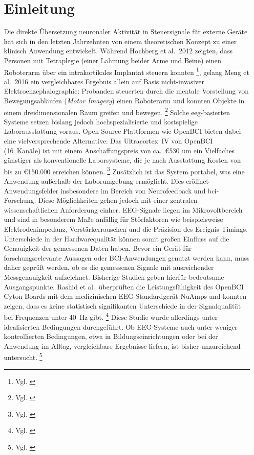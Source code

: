 \chapter{Einleitung} 
Die direkte Übersetzung neuronaler Aktivität in Steuersignale für externe Geräte hat sich in den letzten Jahrzehnten von einem theoretischen Konzept zu einer klinisch Anwendung entwickelt. Während Hochberg et al.\ 2012 zeigten, dass Personen mit Tetraplegie (einer Lähmung beider Arme und Beine) einen Roboterarm über ein intrakortikales Implantat steuern konnten \footnote{Vgl. \cite{hochberg2012_roboticarm}}, gelang Meng et al.\ 2016 ein vergleichbares Ergebnis allein auf Basis nicht-invasiver Elektroenzephalographie: Probanden steuerten durch die mentale Vorstellung von Bewegungsabläufen (\textit{Motor Imagery}) einen Roboterarm und konnten Objekte in einem dreidimensionalen Raum greifen und bewegen. \footnote{Vgl. \cite{meng2016_eeg_roboticarm}}
Solche \acrshort{eeg}-basierten Systeme setzen bislang jedoch hochspezialisierte und kostspielige Laborausstattung voraus. Open-Source-Plattformen wie OpenBCI bieten dabei eine vielversprechende Alternative: Das Ultracortex~IV von OpenBCI (16~Kanäle) ist mit einem Anschaffungspreis von ca.\ \euro{530} um ein Vielfaches günstiger als konventionelle Laborsysteme, die je nach Ausstattung Kosten von bis zu \euro{150.000} erreichen können. \footnote{Vgl. \cite{openbci_ultracortex_shop, kappenman2018_eeg_lab}} Zusätzlich ist das System portabel, was eine Anwendung außerhalb der Laborumgebung ermöglicht. Dies eröffnet Anwendungsfelder insbesondere im Bereich von Neurofeedback und \acrshort{bci}-Forschung.
Diese Möglichkeiten gehen jedoch mit einer zentralen wissenschaftlichen Anforderung einher. EEG-Signale liegen im Mikrovoltbereich und sind in besonderem Maße anfällig für Störfaktoren wie beispielsweise Elektrodenimpedanz, Verstärkerrauschen und die Präzision des Ereignis-Timings. Unterschiede in der Hardwarequalität können somit großen Einfluss auf die Genauigkeit der gemessenen Daten haben. Bevor ein Gerät für forschungsrelevante Aussagen oder BCI-Anwendungen genutzt werden kann, muss daher geprüft werden, ob es die gemessenen Signale mit ausreichender Messgenauigkeit aufzeichnet.
Bisherige Studien geben hierfür bedeutsame Ausgangspunkte. Rashid et al.\ überprüften die Leistungsfähigkeit des \glqq OpenBCI Cyton\grqq{} Boards mit dem medizinischen EEG-Standardgerät \glqq NuAmps\grqq{} und konnten zeigen, dass es keine statistisch signifikanten Unterschiede in der Signalqualität bei Frequenzen unter 40~Hz gibt. \footnote{Vgl. \cite{rashid2018_ads1299}} Diese Studie wurde allerdings unter idealisierten Bedingungen durchgeführt. Ob EEG-Systeme auch unter weniger kontrollierten Bedingungen, etwa in Bildungseinrichtungen oder bei der Anwendung im Alltag, vergleichbare Ergebnisse liefern, ist bisher unzureichend untersucht. \footnote{Vgl. \cite{lee2024_consumer_eeg}}
